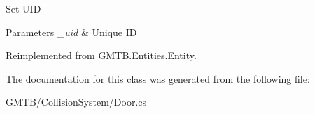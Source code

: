 Set U\+ID 


\begin{DoxyParams}{Parameters}
{\em \+\_\+uid} & Unique ID \\
\hline
\end{DoxyParams}


Reimplemented from \mbox{\hyperlink{class_g_m_t_b_1_1_entities_1_1_entity_ae6d69c22b16436ec6df3b79099e1e81b}{G\+M\+T\+B.\+Entities.\+Entity}}.



The documentation for this class was generated from the following file\+:\begin{DoxyCompactItemize}
\item 
G\+M\+T\+B/\+Collision\+System/Door.\+cs\end{DoxyCompactItemize}
